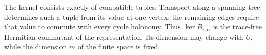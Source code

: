 The kernel consists exactly of compatible tuples.
Transport along a spanning tree determines such a tuple
from its value at one vertex; the remaining edges require
that value to commute with every cycle holonomy. Thus
$\ker B_{\tau,U}$ is the trace-free Hermitian commutant
of the representation. Its dimension may change with
$U$, while the dimension $m$ of the finite space is fixed.
